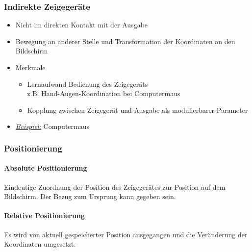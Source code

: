 \documentclass[8pt,a4paper,landscape]{extarticle}
\newcommand{\example}{\textit{\underline{Beispiel:} }}
\begin{document}
\begin{multicols*}{4}
	\subsubsection{Indirekte Zeigegeräte}
	\begin{itemize}
		\item Nicht im direkten Kontakt mit der Ausgabe
		\item Bewegung an anderer Stelle und Transformation der Koordinaten an
		      den Bildschirm
		\item Merkmale
		      \begin{itemize}[nolistsep]
			      \item Lernaufwand Bedienung des Zeigegeräts \\
			            z.B. Hand-Augen-Koordination bei Computermaus
			      \item Kopplung zwischen Zeigegerät und Ausgabe als
			            modulierbarer Parameter
		      \end{itemize}
		\item \example Computermaus
	\end{itemize}
	\subsubsection{Positionierung}
	\paragraph{Absolute Positionierung} Eindeutige Zuordnung der Position des
	Zeigegerätes zur Position auf dem Bildschirm. Der Bezug zum Ursprung kann
	gegeben sein.
	\paragraph{Relative Positionierung} Es wird von aktuell gespeicherter
	Position ausgegangen und die Veränderung der Koordinaten umgesetzt.

\end{multicols*}
\end{document}
